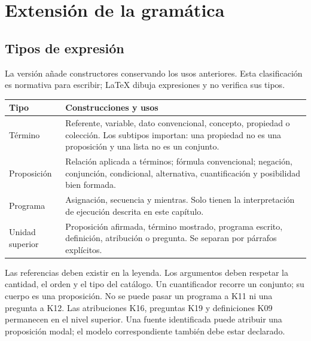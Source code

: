 \section{Extensión de la gramática}\label{sec:extension}

\subsection{Tipos de expresión}
La versión añade constructores conservando los usos anteriores. Esta clasificación
es normativa para escribir; LaTeX dibuja expresiones y no verifica sus tipos.
\begin{longtable}{@{}p{29mm}>{\raggedright\arraybackslash}p{\dimexpr\linewidth-29mm-2\tabcolsep\relax}@{}}
\toprule Tipo & Construcciones y usos \\ \midrule\endhead
Término & Referente, variable, dato convencional, concepto, propiedad o colección.
Los subtipos importan: una propiedad no es una proposición y una lista no es un conjunto. \\[4pt]
Proposición & Relación aplicada a términos; fórmula convencional; negación,
conjunción, condicional, alternativa, cuantificación y posibilidad bien formada. \\[4pt]
Programa & Asignación, secuencia y mientras. Solo tienen la interpretación de
ejecución descrita en este capítulo. \\[4pt]
Unidad superior & Proposición afirmada, término mostrado, programa escrito,
definición, atribución o pregunta. Se separan por párrafos explícitos. \\[4pt]
\bottomrule
\end{longtable}
Las referencias deben existir en la leyenda. Los argumentos deben respetar la
cantidad, el orden y el tipo del catálogo. Un cuantificador recorre un conjunto;
su cuerpo es una proposición. No se puede pasar un programa a K11 ni una pregunta
a K12. Las atribuciones K16, preguntas K19 y definiciones K09 permanecen en el
nivel superior. Una fuente identificada puede atribuir una proposición modal;
el modelo correspondiente también debe estar declarado.

